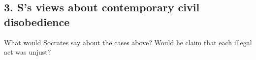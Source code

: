 \documentclass[oneside]{article}
\begin{document}
\subsection*{3. S's views about contemporary civil disobedience}
 What would Socrates say about the cases above? Would he claim that each illegal act was unjust? 




\end{document}
